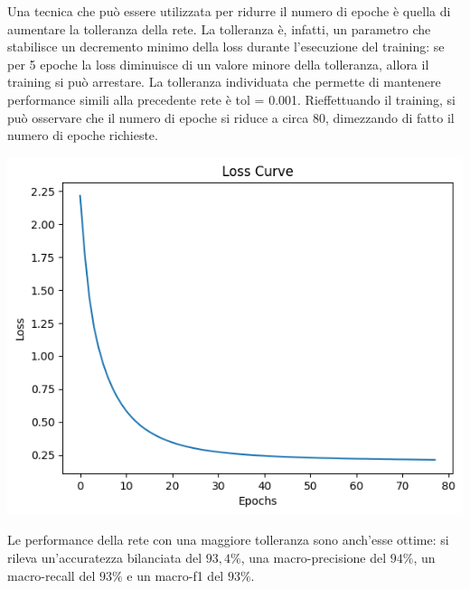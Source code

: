 Una tecnica che può essere utilizzata per ridurre il numero di epoche
è quella di aumentare la tolleranza della rete.
La tolleranza è, infatti, un parametro che stabilisce un decremento minimo
della loss durante l'esecuzione del training: se per 5 epoche la loss
diminuisce di un valore minore della tolleranza, allora il training si può
arrestare.
La tolleranza individuata che permette di mantenere performance simili alla
precedente rete è tol = 0.001. Rieffettuando il training, si può osservare che 
il numero di epoche si riduce a circa 80, dimezzando di fatto il numero
di epoche richieste.

\begin{Figure}
    \centering
    \includegraphics[width=0.9\linewidth]{img/mlp_high_loss.png}
\end{Figure}

Le performance della rete con una maggiore tolleranza sono anch'esse ottime:
si rileva un'accuratezza bilanciata del $93,4\%$, una macro-precisione 
del $94\%$, un macro-recall del $93\%$ e un macro-f1 del $93\%$.

